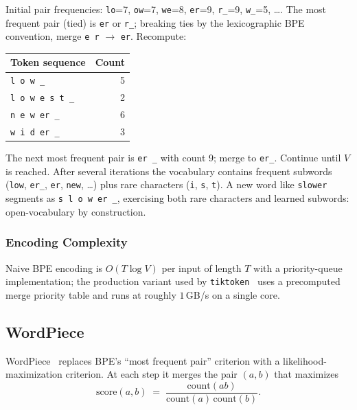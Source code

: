 Initial pair frequencies:
\texttt{lo}=7,
\texttt{ow}=7,
\texttt{we}=8,
\texttt{er}=9,
\texttt{r\_}=9,
\texttt{w\_}=5, \ldots.
The most frequent pair (tied) is \texttt{er} or \texttt{r\_}; breaking
ties by the lexicographic BPE convention, merge \texttt{e r}
$\to$ \texttt{er}. Recompute:

\begin{center}
\begin{tabular}{|l|r|}
\hline
Token sequence & Count \\
\hline
\texttt{l o w \_}                  & 5 \\
\texttt{l o w e s t \_}            & 2 \\
\texttt{n e w er \_}               & 6 \\
\texttt{w i d er \_}               & 3 \\
\hline
\end{tabular}
\end{center}

The next most frequent pair is \texttt{er \_} with count 9; merge to
\texttt{er\_}. Continue until $V$ is reached. After several iterations
the vocabulary contains frequent subwords (\texttt{low}, \texttt{er\_},
\texttt{er}, \texttt{new}, \ldots) plus rare characters (\texttt{i},
\texttt{s}, \texttt{t}). A new word like \texttt{slower} segments as
\texttt{s l o w er \_}, exercising both rare characters and learned
subwords: open-vocabulary by construction.

\subsubsection{Encoding Complexity}

Naive BPE encoding is $O(T \log V)$ per input of length $T$ with a
priority-queue implementation; the production variant used by
\texttt{tiktoken}~\citep{openai_tiktoken} uses a precomputed merge
priority table and runs at roughly $1$\,GB/s on a single core.

\subsection{WordPiece}

WordPiece~\citep{devlin2019bert} replaces BPE's ``most frequent pair''
criterion with a likelihood-maximization criterion. At each step it
merges the pair $(a, b)$ that maximizes
\begin{equation}
\label{eq:week3-wordpiece}
\mathrm{score}(a, b) \;=\;
\frac{\mathrm{count}(ab)}
     {\mathrm{count}(a)\,\mathrm{count}(b)}.
\end{equation}

